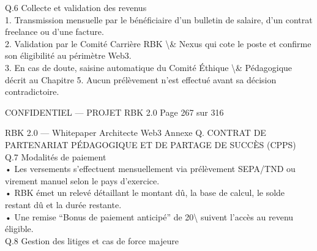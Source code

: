 \documentclass[12pt,landscape,a4paper]{article}
\newenvironment{confidential}
{\begin{tcolorbox}[
    colback=rbkred!5!white,
    colframe=rbkred!75!black,
    title=CONFIDENTIEL,
    fonttitle=\bfseries\color{white},
    coltitle=rbkred!75!black,
    breakable,
    enhanced,
    frame hidden,
    borderline west={2pt}{0pt}{rbkred!75!black}
]}
{\end{tcolorbox}}
\begin{document}
\vspace{0.5em}
\vspace{0.5em}
Q.6 Collecte et validation des revenus\\
1. Transmission mensuelle par le bénéficiaire d’un bulletin de salaire, d’un contrat freelance ou d’une facture.\\
\vspace{0.5em}
2. Validation par le Comité Carrière RBK \textbackslash{}& Nexus qui cote le poste et confirme son éligibilité au périmètre Web3.\\
\vspace{0.5em}
3. En cas de doute, saisine automatique du Comité Éthique \textbackslash{}& Pédagogique décrit au Chapitre 5. Aucun prélèvement n’est effectué avant sa décision contradictoire.\\
\vspace{0.5em}
\vspace{0.5em}
\vspace{0.5em}
\vspace{0.5em}
\begin{confidential}CONFIDENTIEL — PROJET RBK 2.0                                            Page 267 sur 316\end{confidential}
RBK 2.0 — Whitepaper Architecte Web3                          Annexe Q. CONTRAT DE PARTENARIAT PÉDAGOGIQUE ET DE PARTAGE DE SUCCÈS (CPPS)\\
\vspace{0.5em}
\vspace{0.5em}
\vspace{0.5em}
Q.7 Modalités de paiement\\
• Les versements s’effectuent mensuellement via prélèvement SEPA/TND ou virement manuel selon le pays d’exercice.\\
\vspace{0.5em}
• RBK émet un relevé détaillant le montant dû, la base de calcul, le solde restant dû et la durée restante.\\
\vspace{0.5em}
• Une remise “Bonus de paiement anticipé” de 20\textbackslash{}%
suivent l’accès au revenu éligible.\\
\vspace{0.5em}
\vspace{0.5em}
\vspace{0.5em}
Q.8 Gestion des litiges et cas de force majeure\\
\end{document}

